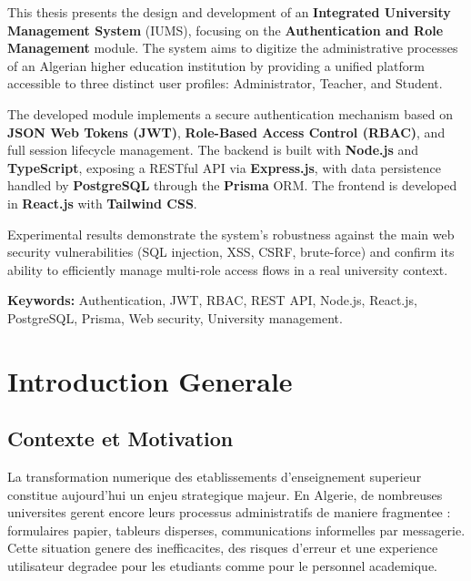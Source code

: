 \documentclass[12pt,a4paper]{report}
\begin{document}
This thesis presents the design and development of an \textbf{Integrated
University Management System} (IUMS), focusing on the \textbf{Authentication
and Role Management} module. The system aims to digitize the administrative
processes of an Algerian higher education institution by providing a
unified platform accessible to three distinct user profiles: Administrator,
Teacher, and Student.

The developed module implements a secure authentication mechanism based on
\textbf{JSON Web Tokens (JWT)}, \textbf{Role-Based Access Control (RBAC)},
and full session lifecycle management. The backend is built with
\textbf{Node.js} and \textbf{TypeScript}, exposing a RESTful API via
\textbf{Express.js}, with data persistence handled by \textbf{PostgreSQL}
through the \textbf{Prisma} ORM. The frontend is developed in
\textbf{React.js} with \textbf{Tailwind CSS}.

Experimental results demonstrate the system's robustness against the main
web security vulnerabilities (SQL injection, XSS, CSRF, brute-force) and
confirm its ability to efficiently manage multi-role access flows in a
real university context.

\vspace{0.5cm}
\textbf{Keywords:} Authentication, JWT, RBAC, REST API, Node.js, React.js,
PostgreSQL, Prisma, Web security, University management.

\tableofcontents
\listoffigures
\listoftables

\chapter*{Introduction Generale}

\section*{Contexte et Motivation}

La transformation numerique des etablissements d'enseignement superieur
constitue aujourd'hui un enjeu strategique majeur. En Algerie, de nombreuses
universites gerent encore leurs processus administratifs de maniere
fragmentee : formulaires papier, tableurs disperses, communications
informelles par messagerie. Cette situation genere des inefficacites, des
risques d'erreur et une experience utilisateur degradee pour les etudiants
comme pour le personnel academique.
\end{document}
